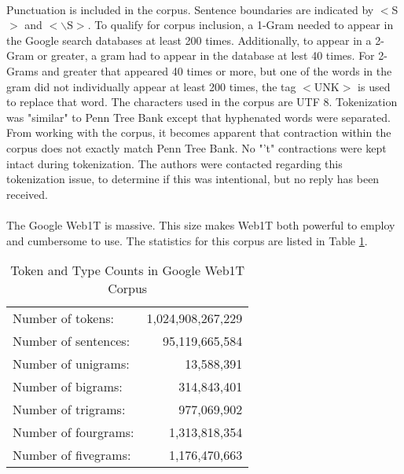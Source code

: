 		\paragraph{} Punctuation is included in the corpus.  Sentence boundaries are indicated by $<$S$>$ and $<\backslash\text{S}>$.  To qualify for corpus inclusion, a 1-Gram needed to appear in the Google search databases at least 200 times.  Additionally, to appear in a 2-Gram or greater, a gram had to appear in the database at lest 40 times.  For 2-Grams and greater that appeared 40 times or more, but one of the words in the gram did not individually appear at least 200 times, the tag $<$UNK$>$ is used to replace that word.  The characters used in the corpus are UTF 8.  Tokenization was "similar" to Penn Tree Bank except that hyphenated words were separated.\cite{brants_web_2006}  From working with the corpus, it becomes apparent that contraction within the corpus does not exactly match Penn Tree Bank.  No "'t" contractions were kept intact during tokenization.  The authors were contacted regarding this tokenization issue, to determine if this was intentional, but no reply has been received.
		\paragraph{} The Google Web1T is massive.  This size makes Web1T both powerful to employ and cumbersome to use. The statistics for this corpus are listed in Table \ref{table:GoogleWeb1T}.
		\begin{center}	
			\begin{table}[h]
			\caption{Token and Type Counts in Google Web1T Corpus}
			\label{table:GoogleWeb1T}
				\begin{center}
					\begin{tabular}{ l r }
						Number of tokens: & 1,024,908,267,229\\
						Number of sentences: & 95,119,665,584\\
						Number of unigrams: & 13,588,391\\
						Number of bigrams: & 314,843,401\\
						Number of trigrams: & 977,069,902\\
						Number of fourgrams: & 1,313,818,354\\
						Number of fivegrams: & 1,176,470,663\\
					\end{tabular}
				\end{center}
			\end{table}
		\end{center}

